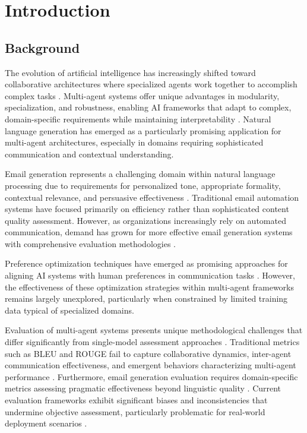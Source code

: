 \chapter{Introduction}

\section{Background}

The evolution of artificial intelligence has increasingly shifted toward collaborative architectures where specialized agents work together to accomplish complex tasks \cite{guo2024llm_multiagent}. Multi-agent systems offer unique advantages in modularity, specialization, and robustness, enabling AI frameworks that adapt to complex, domain-specific requirements while maintaining interpretability \cite{ma2024agentboard}. Natural language generation has emerged as a particularly promising application for multi-agent architectures, especially in domains requiring sophisticated communication and contextual understanding.

Email generation represents a challenging domain within natural language processing due to requirements for personalized tone, appropriate formality, contextual relevance, and persuasive effectiveness \cite{zhang2019email_subject}. Traditional email automation systems have focused primarily on efficiency rather than sophisticated content quality assessment. However, as organizations increasingly rely on automated communication, demand has grown for more effective email generation systems with comprehensive evaluation methodologies \cite{li2023generative_judge}.

Preference optimization techniques have emerged as promising approaches for aligning AI systems with human preferences in communication tasks \cite{rafailov2023dpo}. However, the effectiveness of these optimization strategies within multi-agent frameworks remains largely unexplored, particularly when constrained by limited training data typical of specialized domains.

Evaluation of multi-agent systems presents unique methodological challenges that differ significantly from single-model assessment approaches \cite{yehudai2025survey_llm_agents}. Traditional metrics such as BLEU and ROUGE fail to capture collaborative dynamics, inter-agent communication effectiveness, and emergent behaviors characterizing multi-agent performance \cite{liu2023geval}. Furthermore, email generation evaluation requires domain-specific metrics assessing pragmatic effectiveness beyond linguistic quality \cite{li2023generative_judge}. Current evaluation frameworks exhibit significant biases and inconsistencies that undermine objective assessment, particularly problematic for real-world deployment scenarios \cite{wang2025judging_bias_lrms}.

